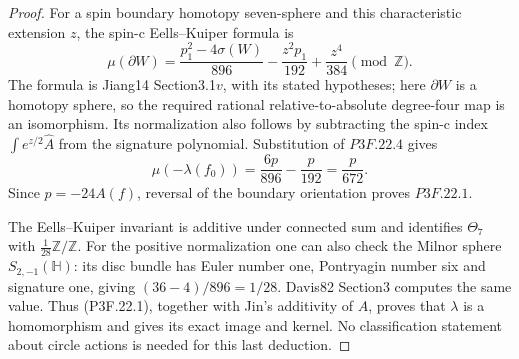 \begin{proof}
For a spin boundary homotopy seven-sphere and this characteristic extension \(z\), the spin-c Eells--Kuiper formula is \[
 \mu(\partial W)=
 \frac{p_1^2-4\sigma(W)}{896}
 -\frac{z^2p_1}{192}+\frac{z^4}{384}\pmod{\mathbb Z}.
\] The formula is Jiang14 Section3.1\(v\), with its stated hypotheses; here \(\partial W\) is a homotopy sphere, so the required rational relative-to-absolute degree-four map is an isomorphism. Its normalization also follows by subtracting the spin-c index \(\int e^{z/2}\widehat A\) from the signature polynomial. Substitution of \(P3F.22.4\) gives \[
 \mu(-\lambda(f_0))=
 \frac{6p}{896}-\frac{p}{192}=\frac{p}{672}.
\] Since \(p=-24A(f)\), reversal of the boundary orientation proves \(P3F.22.1\).

The Eells--Kuiper invariant is additive under connected sum and identifies \(\Theta _7\) with \(\frac1{28}\mathbb Z/\mathbb Z\). For the positive normalization one can also check the Milnor sphere \(S_{2,-1}(\mathbb H)\): its disc bundle has Euler number one, Pontryagin number six and signature one, giving \((36-4)/896=1/28\). Davis82 Section3 computes the same value. Thus (P3F.22.1), together with Jin's additivity of \(A\), proves that \(\lambda\) is a homomorphism and gives its exact image and kernel. No classification statement about circle actions is needed for this last deduction.
\end{proof}
